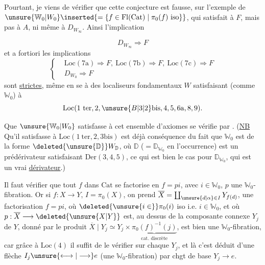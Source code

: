 Pourtant, je viens de vérifier que cette conjecture est fausse, sur l'exemple de $\unsure{\mathbb W_0|W_0}\inserted{=\{f\in\mathrm{Fl}(\mathrm{Cat})\mid\pi_0(f)\ \mathrm{iso}\}}$, qui satisfait à $F$, mais pas à $A$, ni même à $D_{W_\infty}$. Ainsi l'implication

\[
 D_{W_\infty}\Longrightarrow F
\]
et a fortiori les implications
\[
 \left\{\begin{aligned}
 &\mathrm{Loc}(7\mathrm a)\Rightarrow F,\ \mathrm{Loc}(7\mathrm b)\Rightarrow F,\ \mathrm{Loc}(7\mathrm c)\Rightarrow F\\
 &D_{W_0}\Longrightarrow F
 \end{aligned}\right.
\]
sont \uline{strictes}, même en se  à des localiseurs fondamentaux $W$ satisfaisant (comme $\mathbb W_0$) à
\[
 \mathrm{Loc}(1\ \mathrm{ter},2,\unsure{B|3|2}\mathrm{bis},4,5,6\mathrm a,8,9).
\]

Que $\unsure{\mathbb W_0|W_0}$ satisfasse à cet ensemble d'axiomes se vérifie  par . (\uline{NB} Qu'il satisfasse à $\mathrm{Loc}(1\ \mathrm{ter},2,3\mathrm{bis})$ est déjà conséquence du fait que $\mathbb W_0$ est de la forme $\deleted{\unsure{\mathbb D}}W_{\mathbb D}$, où $\mathbb D$ ($=\mathbb D_{\mathbb W_0}$ en l'occurrence) est un prédérivateur satisfaisant $\mathrm{Der}(3,4,5)$, ce qui est bien le cas pour $\mathbb D_{\mathbb W_0}$, qui est un vrai \uline{dérivateur}.)

Il faut vérifier que tout $f$ dans $\mathrm{Cat}$ se factorise en $f=pi$, avec $i\in\mathbb W_0$, $p$ une $\mathbb W_0$-fibration. Or si $f:X\longrightarrow Y$, $I=\pi_0(X)$, on prend $\overline X=\coprod_{\unsure{d|\alpha}\in I}Y_{f(d)}$,  une factorisation $f=pi$, où $\deleted{\unsure{i\in}}\pi_0(i)$ iso i.e. $i\in\mathbb W_0$, et où $p:\overline X\longrightarrow\deleted{\unsure{X|Y}}$ est, au dessus de la composante connexe $Y_j$ de $Y$, donné par le produit $\overline X\mid Y_j\simeq Y_j\times\underbrace{\pi_0(f)^{-1}(j)}_{\text{cat. discrète}}$,   est bien une $\mathbb W_0$-fibration, car grâce à $\mathrm{Loc}(4)$ il suffit de le vérifier sur chaque $Y_j$, et là c'est déduit d'une flèche $I_j\unsure{\longleftrightarrow|\longrightarrow}e$ (une $\mathbb W_0$-fibration) par chgt de base $Y_j\longrightarrow e$.

